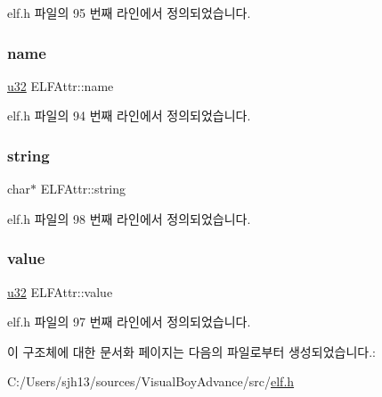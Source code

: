 elf.\+h 파일의 95 번째 라인에서 정의되었습니다.

\mbox{\label{struct_e_l_f_attr_aae677b759e5864de3ec3948837a65700}} 
\subsubsection{\texorpdfstring{name}{name}}
{\footnotesize\ttfamily \mbox{\hyperlink{_system_8h_a10e94b422ef0c20dcdec20d31a1f5049}{u32}} E\+L\+F\+Attr\+::name}



elf.\+h 파일의 94 번째 라인에서 정의되었습니다.

\mbox{\label{struct_e_l_f_attr_aed4d1145aa992f05614f2627df516845}} 
\subsubsection{\texorpdfstring{string}{string}}
{\footnotesize\ttfamily char$\ast$ E\+L\+F\+Attr\+::string}



elf.\+h 파일의 98 번째 라인에서 정의되었습니다.

\mbox{\label{struct_e_l_f_attr_ace26325a106d1a8616f1ecb2e0a209af}} 
\subsubsection{\texorpdfstring{value}{value}}
{\footnotesize\ttfamily \mbox{\hyperlink{_system_8h_a10e94b422ef0c20dcdec20d31a1f5049}{u32}} E\+L\+F\+Attr\+::value}



elf.\+h 파일의 97 번째 라인에서 정의되었습니다.



이 구조체에 대한 문서화 페이지는 다음의 파일로부터 생성되었습니다.\+:\begin{DoxyCompactItemize}
\item 
C\+:/\+Users/sjh13/sources/\+Visual\+Boy\+Advance/src/\mbox{\hyperlink{elf_8h}{elf.\+h}}\end{DoxyCompactItemize}
